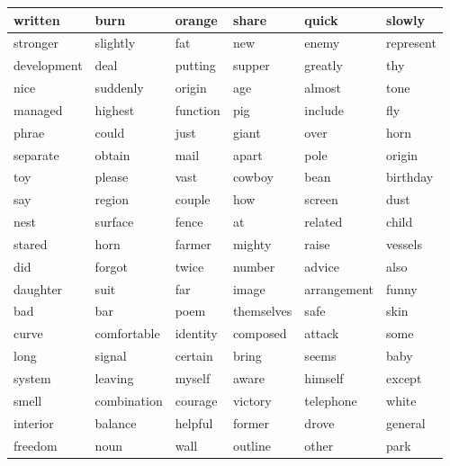 \documentclass{jcls}
\begin{document}
\begin{fullwidth}
  \begin{longtable}{@{}llllll@{}}
    written     & burn        & orange   & share      & quick       & slowly    \\* \midrule
    \endhead
    \endfoot
    \endlastfoot
    stronger    & slightly    & fat      & new        & enemy       & represent \\
    development & deal        & putting  & supper     & greatly     & thy       \\
    nice        & suddenly    & origin   & age        & almost      & tone      \\
    managed     & highest     & function & pig        & include     & fly       \\
    phrae       & could       & just     & giant      & over        & horn      \\
    separate    & obtain      & mail     & apart      & pole        & origin    \\
    toy         & please      & vast     & cowboy     & bean        & birthday  \\
    say         & region      & couple   & how        & screen      & dust      \\
    nest        & surface     & fence    & at         & related     & child     \\
    stared      & horn        & farmer   & mighty     & raise       & vessels   \\
    did         & forgot      & twice    & number     & advice      & also      \\
    daughter    & suit        & far      & image      & arrangement & funny     \\
    bad         & bar         & poem     & themselves & safe        & skin      \\
    curve       & comfortable & identity & composed   & attack      & some      \\
    long        & signal      & certain  & bring      & seems       & baby      \\
    system      & leaving     & myself   & aware      & himself     & except    \\
    smell       & combination & courage  & victory    & telephone   & white     \\
    interior    & balance     & helpful  & former     & drove       & general   \\
    freedom     & noun        & wall     & outline    & other       & park      \\

\end{longtable}
\end{fullwidth}
\end{document}
